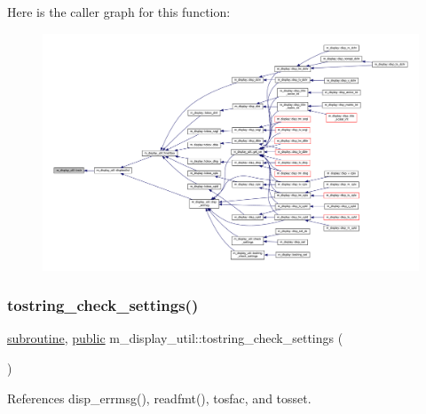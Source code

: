Here is the caller graph for this function\+:
\nopagebreak
\begin{figure}[H]
\begin{center}
\leavevmode
\includegraphics[width=350pt]{namespacem__display__util_ae2d4ae17104c7a91b0a3e4962e3af54a_icgraph}
\end{center}
\end{figure}
\mbox{\label{namespacem__display__util_a76361afb9f9c3952c258f1f8053ec62a}} 
\subsubsection{\texorpdfstring{tostring\+\_\+check\+\_\+settings()}{tostring\_check\_settings()}}
{\footnotesize\ttfamily \hyperlink{M__stopwatch_83_8txt_acfbcff50169d691ff02d4a123ed70482}{subroutine}, \hyperlink{M__stopwatch_83_8txt_a2f74811300c361e53b430611a7d1769f}{public} m\+\_\+display\+\_\+util\+::tostring\+\_\+check\+\_\+settings (\begin{DoxyParamCaption}{ }\end{DoxyParamCaption})}



References disp\+\_\+errmsg(), readfmt(), tosfac, and tosset.

